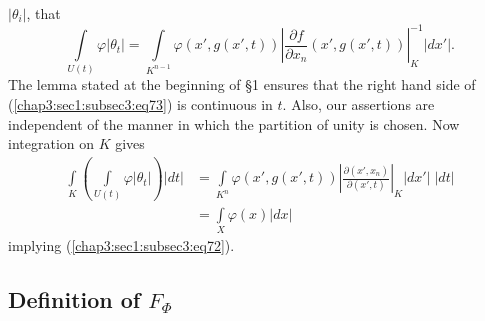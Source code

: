 $|\theta_{i}|$, that
\begin{equation*}
  \int\limits_{U(t)}\varphi|\theta_{t}|=\int\limits_{K^{n-1}}
  \varphi(x',g(x',t)) \left|\frac{\partial
  f}{\partial  x_{n}}(x',g(x',t))\right|^{-1}_{K}|dx'|.
  \tag{73}\label{chap3:sec1:subsec3:eq73}  
\end{equation*}
The lemma stated at the beginning of \S 1 ensures that
the right hand side of (\ref{chap3:sec1:subsec3:eq73}) is continuous in $t$. Also, our
assertions are independent of the manner in which the partition of
unity is chosen. Now integration on $K$ gives
\begin{align*}
\int\limits_{K}\left(\int\limits_{U(t)}\varphi|\theta_{t}|\right)|dt|
&=
\int\limits_{K^{n}}\varphi(x',g(x',t))\left|\frac{\partial(x',x_{n})}{\partial
(x',t)}\right|_{K}|dx'|\;|dt|\\
&=\int\limits_{X}\varphi(x)|dx|
\end{align*}
implying (\ref{chap3:sec1:subsec3:eq72}).

\subsection{Definition of $F_{\Phi}$}\label{chap3:sec1:subsec4} %

